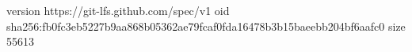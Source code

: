 version https://git-lfs.github.com/spec/v1
oid sha256:fb0fc3eb5227b9aa868b05362ae79fcaf0fda16478b3b15baeebb204bf6aafc0
size 55613
